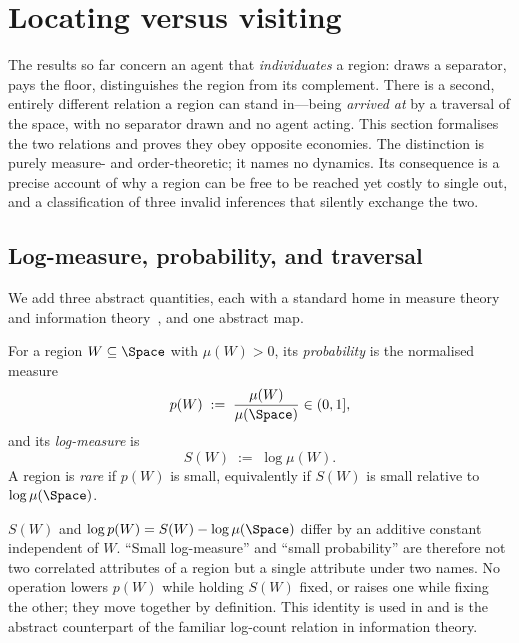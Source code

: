 
\section{Locating versus visiting}
\label{sec:locating}

The results so far concern an agent that \emph{individuates} a region: draws a
separator, pays the floor, distinguishes the region from its complement. There is
a second, entirely different relation a region can stand in---being \emph{arrived
at} by a traversal of the space, with no separator drawn and no agent acting. This
section formalises the two relations and proves they obey opposite economies. The
distinction is purely measure- and order-theoretic; it names no dynamics. Its
consequence is a precise account of why a region can be free to be reached yet
costly to single out, and a classification of three invalid inferences that
silently exchange the two.

\subsection{Log-measure, probability, and traversal}

We add three abstract quantities, each with a standard home in measure theory and
information theory~\citep{shannon1948,cover2006}, and one abstract map.

\begin{definition}
\label{def:logmeasure}
For a region $W\subseteq\Space$ with $\mu(W)>0$, its \emph{probability} is the
normalised measure
\[
p(W)\;:=\;\frac{\mu(W)}{\mu(\Space)}\in(0,1],
\]
and its \emph{log-measure} is
\[
S(W)\;:=\;\log\mu(W).
\]
A region is \emph{rare} if $p(W)$ is small, equivalently if $S(W)$ is small
relative to $\log\mu(\Space)$.
\end{definition}

\begin{remark}
\label{rem:one-quantity}
$S(W)$ and $\log p(W)=S(W)-\log\mu(\Space)$ differ by an additive constant
independent of $W$. ``Small log-measure'' and ``small probability'' are therefore
not two correlated attributes of a region but a single attribute under two names.
No operation lowers $p(W)$ while holding $S(W)$ fixed, or raises one while fixing
the other; they move together by definition. This identity is used in
 and is the abstract counterpart of the familiar
log-count relation in information theory.
\end{remark}

